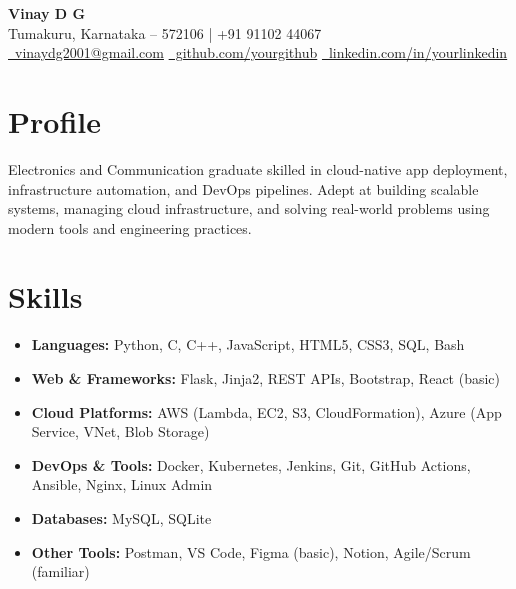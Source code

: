 \documentclass[a4paper,10pt]{article}
\begin{document}
\begin{center}
    {\Huge \bfseries Vinay D G} \\[2pt]
    Tumakuru, Karnataka – 572106 \quad | \quad +91 91102 44067 \\[2pt]
    \href{mailto:vinaydg2001@gmail.com}{ \ vinaydg2001@gmail.com} \quad
    \href{https://github.com/yourgithub}{ \ github.com/yourgithub} \quad
    \href{https://linkedin.com/in/yourlinkedin}{ \ linkedin.com/in/yourlinkedin}
\end{center}

\section*{Profile}
Electronics and Communication graduate skilled in cloud-native app deployment, infrastructure automation, and DevOps pipelines. Adept at building scalable systems, managing cloud infrastructure, and solving real-world problems using modern tools and engineering practices.

\section*{Skills}
\begin{multicols}{2}
\begin{itemize}
    \item \textbf{Languages:} Python, C, C++, JavaScript, HTML5, CSS3, SQL, Bash
    \item \textbf{Web \& Frameworks:} Flask, Jinja2, REST APIs, Bootstrap, React (basic)
    \item \textbf{Cloud Platforms:} AWS (Lambda, EC2, S3, CloudFormation), Azure (App Service, VNet, Blob Storage)
    \item \textbf{DevOps \& Tools:} Docker, Kubernetes, Jenkins, Git, GitHub Actions, Ansible, Nginx, Linux Admin
    \item \textbf{Databases:} MySQL, SQLite
    \item \textbf{Other Tools:} Postman, VS Code, Figma (basic), Notion, Agile/Scrum (familiar)
\end{itemize}
\end{multicols}

\end{document}
